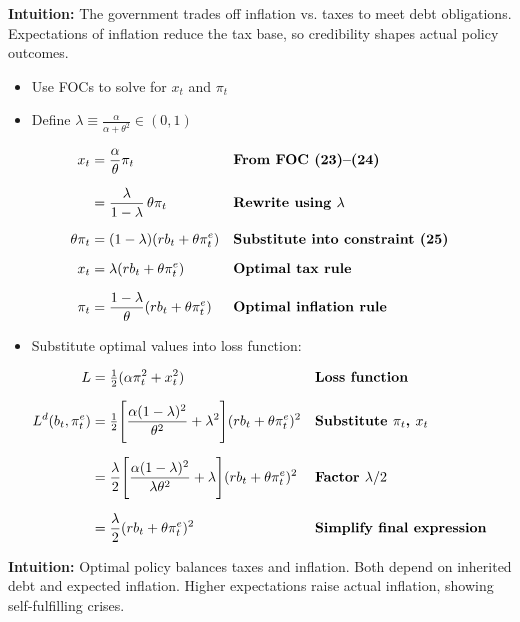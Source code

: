 \documentclass[12pt]{article}
\begin{document}
\textbf{Intuition:} The government trades off inflation vs. taxes to meet debt obligations. Expectations of inflation reduce the tax base, so credibility shapes actual policy outcomes.

\begin{itemize}
    \item Use FOCs to solve for $x_t$ and $\pi_t$
    \item Define $\lambda \equiv \frac{\alpha}{\alpha+\theta^2} \in (0,1)$
\end{itemize}

\singlespacing
\begin{align}
x_t &= \frac{\alpha}{\theta}\pi_t && \text{\textbf{From FOC (23)--(24)}} \\[6pt]
    &= \frac{\lambda}{1-\lambda}\,\theta \pi_t && \text{\textbf{Rewrite using $\lambda$}} \\[6pt]
\theta \pi_t &= (1-\lambda)(rb_t + \theta \pi_t^e) && \text{\textbf{Substitute into constraint (25)}} \\[6pt]
x_t &= \lambda(rb_t + \theta \pi_t^e) && \text{\textbf{Optimal tax rule}} \\[6pt]
\pi_t &= \frac{1-\lambda}{\theta}(rb_t + \theta \pi_t^e) && \text{\textbf{Optimal inflation rule}}
\end{align}

\begin{itemize}
    \item Substitute optimal values into loss function:
\end{itemize}

\singlespacing
\begin{align}
L &= \tfrac{1}{2}(\alpha \pi_t^2 + x_t^2) && \text{\textbf{Loss function}} \\[6pt]
L^d(b_t,\pi_t^e) &= \tfrac{1}{2}\Bigg[\frac{\alpha(1-\lambda)^2}{\theta^2} + \lambda^2\Bigg](rb_t + \theta \pi_t^e)^2 && \text{\textbf{Substitute $\pi_t$, $x_t$}} \\[6pt]
 &= \frac{\lambda}{2}\Bigg[\frac{\alpha(1-\lambda)^2}{\lambda \theta^2} + \lambda \Bigg](rb_t + \theta \pi_t^e)^2 && \text{\textbf{Factor $\lambda/2$}} \\[6pt]
 &= \frac{\lambda}{2}(rb_t + \theta \pi_t^e)^2 && \text{\textbf{Simplify final expression}}
\end{align}

\textbf{Intuition:} Optimal policy balances taxes and inflation. Both depend on inherited debt and expected inflation. Higher expectations raise actual inflation, showing self-fulfilling crises.
\end{document}
